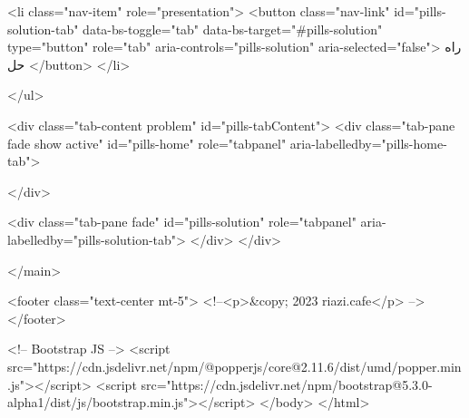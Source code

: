     <li class="nav-item" role="presentation">
        <button class="nav-link" id="pills-solution-tab" data-bs-toggle="tab" data-bs-target="#pills-solution" type="button" role="tab" aria-controls="pills-solution" aria-selected="false">
            راه حل
        </button>
    </li>

</ul>

<div class="tab-content problem" id="pills-tabContent">
  <div class="tab-pane fade show active" id="pills-home" role="tabpanel" aria-labelledby="pills-home-tab">
    
  </div>


    <div class="tab-pane fade" id="pills-solution" role="tabpanel" aria-labelledby="pills-solution-tab">
    </div>
</div>

    </main>

    <footer class="text-center mt-5">
        <!--<p>&copy; 2023 riazi.cafe</p> -->
    </footer>

    <!-- Bootstrap JS -->
    <script src="https://cdn.jsdelivr.net/npm/@popperjs/core@2.11.6/dist/umd/popper.min.js"></script>
    <script src="https://cdn.jsdelivr.net/npm/bootstrap@5.3.0-alpha1/dist/js/bootstrap.min.js"></script>
</body>
</html>

